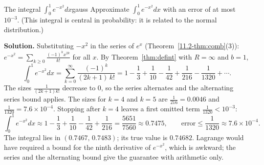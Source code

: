 \documentclass[11pt]{article}
\begin{document}
\begin{exmp}{The integral $\int_0^1e^{-x^2}dx$}{gauss}
Approximate $\displaystyle\int_0^1e^{-x^2}dx$ with an error of at most $10^{-3}$. (This integral is central in probability: it is related to the normal distribution.)

\textbf{Solution.} Substituting $-x^2$ in the series of $e^x$ (Theorem~\ref{11.2-thm:comb}(3)): $e^{-x^2}=\sum_{k\ge0}\frac{(-1)^kx^{2k}}{k!}$ for all $x$. By Theorem~\ref{thm:defint} with $R=\infty$ and $b=1$,
\[
\int_0^1e^{-x^2}dx=\sum_{k=0}^\infty\frac{(-1)^k}{(2k+1)\,k!}=1-\frac13+\frac1{10}-\frac1{42}+\frac1{216}-\frac1{1320}+\cdots .
\]
The sizes $\frac1{(2k+1)k!}$ decrease to $0$, so the series alternates and the alternating series bound applies. The sizes for $k=4$ and $k=5$ are $\frac1{216}=0.0046$ and $\frac1{1320}=7.6\times10^{-4}$. Stopping after $k=4$ leaves a first omitted term $\frac1{1320}<10^{-3}$:
\[
\int_0^1e^{-x^2}dx\approx1-\frac13+\frac1{10}-\frac1{42}+\frac1{216}=\frac{5651}{7560}\approx0.7475,\qquad\text{error}\le\frac1{1320}\approx7.6\times10^{-4}.
\]
The integral lies in $(0.7467,\,0.7483)$; its true value is $0.74682$. Lagrange would have required a bound for the ninth derivative of $e^{-x^2}$, which is awkward; the series and the alternating bound give the guarantee with arithmetic only.
\end{exmp}
\end{document}
